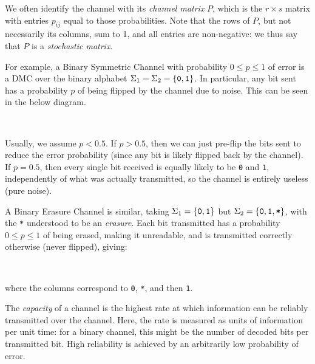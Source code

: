 \documentclass{article}
\begin{document}
We often identify the channel with its \textit{channel matrix} $P$,
which is the $r \times s$ matrix
with entries $p_{ij}$ equal to those probabilities.
Note that the rows of $P$, but not necessarily its columns, sum to 1,
and all entries are non-negative:
we thus say that $P$ is a \textit{stochastic matrix}.

\begin{example}
	\label{binary-symmetric-erasure-channel}
	For example, a Binary Symmetric Channel
	with probability $0 \leq p \leq 1$ of error
	is a DMC over the binary alphabet $\Sigma_1 = \Sigma_2 = \left\lbrace \texttt{0}, \texttt{1} \right\rbrace$.
	In particular, any bit sent has a probability $p$
	of being flipped by the channel due to noise.
	This can be seen in the below diagram.

	\  \

	Usually, we assume $p < 0.5$.
	If $p > 0.5$,
	then we can just pre-flip the bits sent to reduce the error probability
	(since any bit is likely flipped back by the channel).
	If $p = 0.5$,
	then every single bit received is equally likely to be \texttt{0} and \texttt{1},
	independently of what was actually transmitted,
	so the channel is entirely useless (pure noise).

	A Binary Erasure Channel is similar,
	taking $\Sigma_1 = \left\lbrace \texttt{0}, \texttt{1} \right\rbrace$ but
	$\Sigma_2 = \left\lbrace \texttt{0}, \texttt{1}, \texttt{*} \right\rbrace$,
	with the \texttt{*} understood to be an \textit{erasure}.
	Each bit transmitted has a probability $0 \leq p \leq 1$ of being erased,
	making it unreadable,
	and is transmitted correctly otherwise (never flipped), giving:

	\  \

	where the columns correspond to \texttt{0}, \texttt{*}, and then \texttt{1}.
\end{example}

\begin{definition}[Capacity]
	\label{capacity-definition-heuristic}
    The \textit{capacity} of a channel is
    the highest rate at which information
    can be reliably transmitted over the channel.
    Here, the rate is measured as units of information per unit time:
    for a binary channel, this might be
    the number of decoded bits per transmitted bit.
    High reliability is achieved by
    an arbitrarily low probability of error.
\end{definition}

\end{document}

